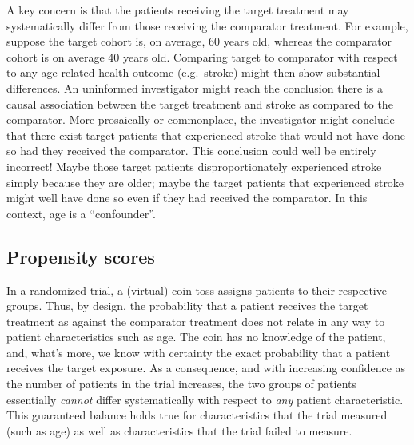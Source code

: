 \documentclass[11pt]{book}
\theoremstyle{definition}
\theoremstyle{definition}
\theoremstyle{definition}
\theoremstyle{remark}
\begin{document}
A key concern is that the patients receiving the target treatment may systematically differ from those receiving the comparator treatment. For example, suppose the target cohort is, on average, 60 years old, whereas the comparator cohort is on average 40 years old. Comparing target to comparator with respect to any age-related health outcome (e.g.~stroke) might then show substantial differences. An uninformed investigator might reach the conclusion there is a causal association between the target treatment and stroke as compared to the comparator. More prosaically or commonplace, the investigator might conclude that there exist target patients that experienced stroke that would not have done so had they received the comparator. This conclusion could well be entirely incorrect! Maybe those target patients disproportionately experienced stroke simply because they are older; maybe the target patients that experienced stroke might well have done so even if they had received the comparator. In this context, age is a ``confounder''.

\hypertarget{propensity-scores}{%
\subsection{Propensity scores}\label{propensity-scores}}


In a randomized trial, a (virtual) coin toss assigns patients to their respective groups. Thus, by design, the probability that a patient receives the target treatment as against the comparator treatment does not relate in any way to patient characteristics such as age. The coin has no knowledge of the patient, and, what's more, we know with certainty the exact probability that a patient receives the target exposure. As a consequence, and with increasing confidence as the number of patients in the trial increases, the two groups of patients essentially \emph{cannot} differ systematically with respect to \emph{any} patient characteristic. This guaranteed balance holds true for characteristics that the trial measured (such as age) as well as characteristics that the trial failed to measure.
\end{document}

